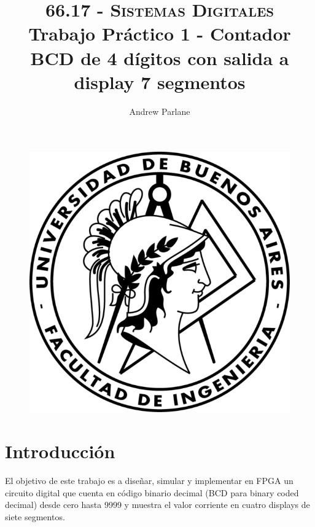 \documentclass[a4paper]{article}
\begin{document}
\begin{figure}
\centering
\includegraphics[scale=1]{./img/logo-facu}
\end{figure}

\title{\large\textsc{66.17 - Sistemas Digitales}\\
\large Trabajo Práctico 1 - Contador BCD de 4 dígitos con salida a display 7 segmentos}

\author{
Andrew Parlane \\
}

\maketitle

\newpage

\tableofcontents

\listoffigures

\newpage

\section{Introducción}

El objetivo de este trabajo es a diseñar, simular y implementar en FPGA un circuito digital que cuenta en código binario decimal (BCD para binary coded decimal) desde cero hasta 9999 y muestra el valor corriente en cuatro displays de siete segmentos.
\end{document}
